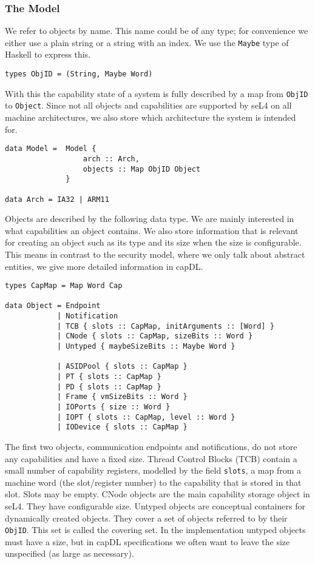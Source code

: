 \documentclass[a4paper,12pt]{article}
\begin{document}
\subsubsection{The Model}
We refer to objects by name. This name could be of any type; for convenience we either use a plain string or a string with an index. We use the \texttt{Maybe} type of Haskell to express this. 

\begin{verbatim}
types ObjID = (String, Maybe Word)
\end{verbatim}

With this the capability state of a system is fully described by a map from \texttt{ObjID} to \texttt{Object}. Since not all objects and capabilities are supported by seL4 on all machine architectures, we also store which architecture the system is intended for.

\begin{verbatim}
data Model =  Model {
                  arch :: Arch,
                  objects :: Map ObjID Object
              } 

data Arch = IA32 | ARM11
\end{verbatim}

Objects are described by the following data type. We are mainly interested in what capabilities an object contains. We also store information that is relevant for creating an object such as its type and its size when the size is configurable. This means in contrast to the security model, where we only talk about abstract entities, we give more detailed information in capDL.

\begin{verbatim}
types CapMap = Map Word Cap

data Object = Endpoint
            | Notification
            | TCB { slots :: CapMap, initArguments :: [Word] }
            | CNode { slots :: CapMap, sizeBits :: Word } 
            | Untyped { maybeSizeBits :: Maybe Word }

            | ASIDPool { slots :: CapMap }
            | PT { slots :: CapMap }
            | PD { slots :: CapMap }
            | Frame { vmSizeBits :: Word }
            | IOPorts { size :: Word }
            | IOPT { slots :: CapMap, level :: Word }
            | IODevice { slots :: CapMap }
\end{verbatim}

The first two objects, communication endpoints and notifications, do not store any capabilities and have a fixed size. Thread Control Blocks (TCB) contain a small number of capability registers, modelled by the field \texttt{slots}, a map from a machine word (the slot/register number) to the capability that is stored in that slot. Slots may be empty. CNode objects are the main capability storage object in seL4. They have configurable size. Untyped objects are conceptual containers for dynamically created objects. They cover a set of objects referred to by their \texttt{ObjID}. This set is called the covering set. In the implementation untyped objects must have a size, but in capDL specifications we often want to leave the size unspecified (as large as necessary). 
\end{document}
